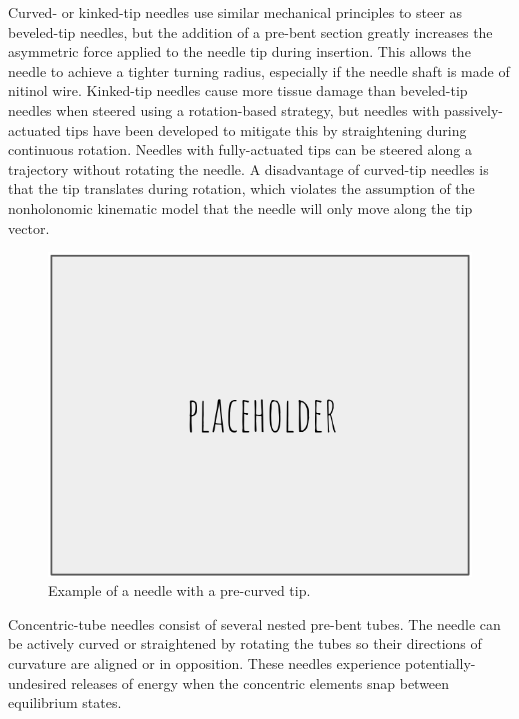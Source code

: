 Curved- or kinked-tip needles use similar mechanical principles to steer as beveled-tip needles, but the addition of a pre-bent section greatly increases the asymmetric force applied to the needle tip during insertion\cite{reed_integrated_2008}. This allows the needle to achieve a tighter turning radius, especially if the needle shaft is made of nitinol wire. Kinked-tip needles cause more tissue damage than beveled-tip needles when steered using a rotation-based strategy, but needles with passively-actuated tips have been developed to mitigate this by straightening during continuous rotation\cite{swaney_flexure-based_2013}. Needles with fully-actuated tips can be steered along a trajectory without rotating the needle\cite{roesthuis_modeling_2015}. A disadvantage of curved-tip needles is that the tip translates during rotation, which violates the assumption of the nonholonomic kinematic model that the needle will only move along the tip vector\cite{reed_integrated_2008}.

\begin{figure}[h]
\includegraphics[width=1.0\textwidth]{Fig/placeholder.png}
\caption{Example of a needle with a pre-curved tip\cite{reed_integrated_2008}.}
\label{fig:kinked_tip}
\end{figure}

Concentric-tube needles consist of several nested pre-bent tubes\cite{webster_mechanics_2009}. The needle can be actively curved or straightened by rotating the tubes so their directions of curvature are aligned or in opposition. These needles experience potentially-undesired releases of energy when the concentric elements snap between equilibrium states.

